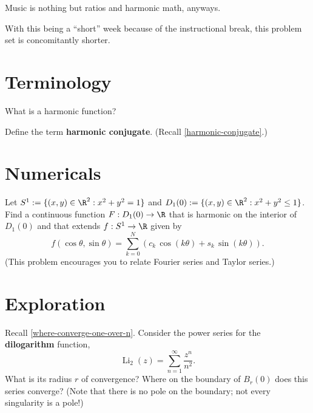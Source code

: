 \documentclass{homework}
\author{Jim Fowler}
\DeclareMathOperator{\polylog}{Li}
\newcommand{\dilog}{\polylog_2}
\begin{document}
\maketitle

\begin{inspiration}
    Music is nothing but ratios and harmonic math, anyways.
\end{inspiration}

With this being a ``short'' week because of the instructional break,
this problem set is concomitantly shorter.

\section{Terminology}

\begin{problem}
  What is a harmonic function?
\end{problem}

\begin{problem}
  Define the term \textbf{harmonic conjugate}.  (Recall \ref{harmonic-conjugate}.)
\end{problem}

\section{Numericals}

\begin{problem}\label{relate-fourier-and-taylor-series}Let $S^1 := \{(x,y) \in \R^2 : x^2 + y^2 = 1 \}$ and $D_1(0) := \{ (x,y) \in \R^2 : x^2 + y^2 \leq 1 \}$.  Find a continuous function $F : D_1(0) \to \R$ that is harmonic on the interior of $D_1(0)$ and that extends
  $f : S^1 \to \R$ given by
 \[
   f(\cos \theta,\sin \theta) = \sum_{k=0}^N \left(c_k \, \cos \left( k\theta \right) + s_k \, \sin \left( k \theta \right) \right).
 \]
 (This problem encourages you to relate Fourier series and Taylor series.)
\end{problem}

\section{Exploration}

\begin{problem}
  Recall \ref{where-converge-one-over-n}.  Consider the power series for the \textbf{dilogarithm} function,
  \[
    \dilog(z) = \sum_{n=1}^\infty \frac{z^n}{n^2}.
  \]
  What is its radius $r$ of convergence?  Where on the boundary of
  $B_r(0)$ does this series converge?  (Note that there is no pole on
  the boundary; not every singularity is a pole!)
\end{problem}
\end{document}
